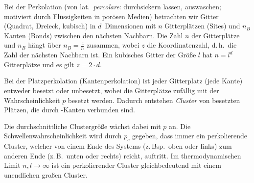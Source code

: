 
\NewDocumentCommand{}
\date{Ausgabe: Fr, 28.06.2019, Besprechung: Fr, 05.07.2019}
\setcounter{question}{18}


\maketitle

Bei der Perkolation (von lat.\ \textit{percolare}: durchsickern lassen, auswaschen; motiviert durch Flüssigkeiten in porösen Medien) betrachten wir Gitter (Quadrat, Dreieck, kubisch) in $d$~Dimensionen mit $n$ Gitterplätzen (Sites) und $n_{B}$ Kanten (Bonds) zwischen den nächsten Nachbarn.
Die Zahl $n$ der Gitterplätze und $n_{B}$ hängt über $n_{B} = \frac{z}{n}$ zusammen, wobei $z$ die Koordinatenzahl, d.\,h.\ die Zahl der nächsten Nachbarn ist.
Ein kubisches Gitter der Größe $l$ hat $n = l^d$ Gitterplätze und es gilt $z = 2·d$.

Bei der Platzperkolation (Kantenperkolation) ist jeder Gitterplatz (jede Kante) entweder besetzt oder unbesetzt, wobei die Gitterplätze zufällig mit der Wahrscheinlichkeit $p$ besetzt werden.
Dadurch entstehen \textit{Cluster} von besetzten Plätzen, die durch -Kanten verbunden sind.

Die durchschnittliche Clustergröße wächst dabei mit $p$ an.
Die Schwellenwahrscheinlichkeit wird durch $p_c$ gegeben, dass immer ein perkolierende Cluster, welcher von einem Ende des Systems (z.\,Bsp.\ oben oder links) zum anderen Ende (z.\,B.\ unten oder rechts) reicht, auftritt.
Im thermodynamischen Limit $n, l → ∞$ ist ein perkolierender Cluster gleichbedeutend mit einem unendlichen großen Cluster.

